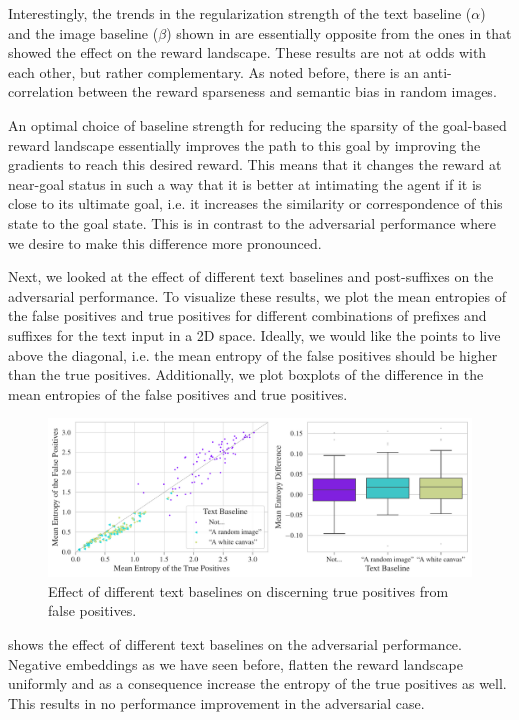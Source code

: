 Interestingly, the trends in the regularization strength of the text baseline (\(\alpha\)) and the image baseline (\(\beta\)) shown in  are essentially opposite from the ones in  that showed the effect on the reward landscape.
These results are not at odds with each other, but rather complementary. 
As noted before, there is an anti-correlation between the reward sparseness and semantic bias in random images.

An optimal choice of baseline strength for reducing the sparsity of the goal-based reward landscape essentially improves the path to this goal by improving the gradients to reach this desired reward.
This means that it changes the reward at near-goal status in such a way that it is better at intimating the agent if it is close to its ultimate goal, i.e. it increases the similarity or correspondence of this state to the goal state.
This is in contrast to the adversarial performance where we desire to make this difference more pronounced.

Next, we looked at the effect of different text baselines and post-suffixes on the adversarial performance.
To visualize these results, we plot the mean entropies of the false positives and true positives for different combinations of prefixes and suffixes for the text input in a 2D space.
Ideally, we would like the points to live above the diagonal, i.e. the mean entropy of the false positives should be higher than the true positives.
Additionally, we plot boxplots of the difference in the mean entropies of the false positives and true positives.

\begin{figure}[H]
    \centering
    \includegraphics[width=\textwidth]{images/baseline_adversarial_2.pdf}
    \caption{Effect of different text baselines on discerning true positives from false positives.}
    \label{fig:baseline-adversarial}
\end{figure}

 shows the effect of different text baselines on the adversarial performance.
Negative embeddings as we have seen before, flatten the reward landscape uniformly and as a consequence increase the entropy of the true positives as well.
This results in no performance improvement in the adversarial case.

